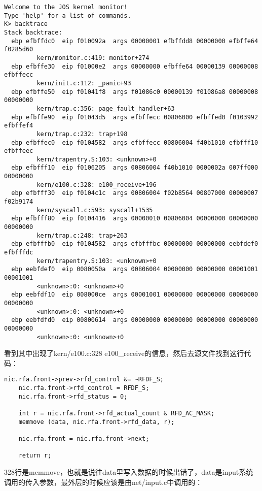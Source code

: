 \documentclass{article}
\begin{document}
\begin{CJK*}{UTF8}{gkai}
\begin{lstlisting}[style=console]
Welcome to the JOS kernel monitor!
Type 'help' for a list of commands.
K> backtrace
Stack backtrace:
  ebp efbffdc0  eip f010092a  args 00000001 efbffdd8 00000000 efbffe64 f0285d60
         kern/monitor.c:419: monitor+274
  ebp efbffe30  eip f01000e2  args 00000000 efbffe64 00000139 00000008 efbffecc
         kern/init.c:112: _panic+93
  ebp efbffe50  eip f01041f8  args f01086c0 00000139 f01086a8 00000008 00000000
         kern/trap.c:356: page_fault_handler+63
  ebp efbffe90  eip f01043d5  args efbffecc 00806000 efbffed0 f0103992 efbffef4
         kern/trap.c:232: trap+198
  ebp efbffec0  eip f0104582  args efbffecc 00806004 f40b1010 efbfff10 efbffeec
         kern/trapentry.S:103: <unknown>+0
  ebp efbfff10  eip f0106205  args 00806004 f40b1010 0000002a 007ff000 00000000
         kern/e100.c:328: e100_receive+196
  ebp efbfff30  eip f0104c1c  args 00806004 f02b8564 00807000 00000007 f02b9174
         kern/syscall.c:593: syscall+1535
  ebp efbfff80  eip f0104416  args 00000010 00806004 00000000 00000000 00000000
         kern/trap.c:248: trap+263
  ebp efbfffb0  eip f0104582  args efbfffbc 00000000 00000000 eebfdef0 efbfffdc
         kern/trapentry.S:103: <unknown>+0
  ebp eebfdef0  eip 0080050a  args 00806004 00000000 00000000 00001001 00001001
         <unknown>:0: <unknown>+0
  ebp eebfdf10  eip 008000ce  args 00001001 00000000 00000000 00000000 00000000
         <unknown>:0: <unknown>+0
  ebp eebfdfd0  eip 00800614  args 00000000 00000000 00000000 00000000 00000000
         <unknown>:0: <unknown>+0
\end{lstlisting}

看到其中出现了kern/e100.c:328 e100\_receive的信息，然后去源文件找到这行代码：

\begin{lstlisting}[style=ccode, firstnumber=323, title={\scriptsize \ttfamily \bfseries kern/e100.c: e100\_receive()}]
    nic.rfa.front->prev->rfd_control &= ~RFDF_S;
    nic.rfa.front->rfd_control = RFDF_S;
    nic.rfa.front->rfd_status = 0;

    int r = nic.rfa.front->rfd_actual_count & RFD_AC_MASK;
    memmove (data, nic.rfa.front->rfd_data, r);

    nic.rfa.front = nic.rfa.front->next;

    return r;
\end{lstlisting}

328行是memmove，也就是说往data里写入数据的时候出错了，data是input系统调用的传入参数，最外层的时候应该是由net/input.c中调用的：



\end{CJK*}
\end{document}
